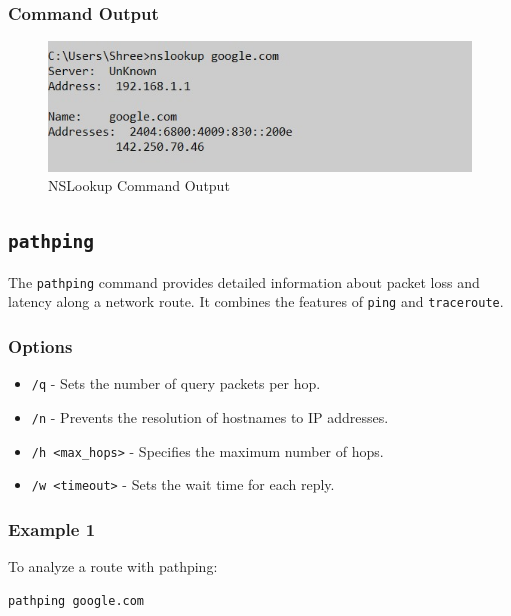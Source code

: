 \documentclass{article}
\begin{document}
\subsubsection{Command Output}
\begin{figure}[htbp]
    \centering
    \includegraphics[]{nslookup.png}
    \caption{NSLookup Command Output}
    \label{fig:nslookup_output}
\end{figure}
\clearpage  %
\subsection{\texttt{pathping}}
The \texttt{pathping} command provides detailed information about packet loss and latency along a network route. It combines the features of \texttt{ping} and \texttt{traceroute}.

\subsubsection{Options}
\begin{itemize}
    \item \texttt{/q} - Sets the number of query packets per hop.
    \item \texttt{/n} - Prevents the resolution of hostnames to IP addresses.
    \item \texttt{/h \textless max\_hops\textgreater} - Specifies the maximum number of hops.
    \item \texttt{/w \textless timeout\textgreater} - Sets the wait time for each reply.
\end{itemize}

\subsubsection{Example 1}
To analyze a route with pathping:
\begin{verbatim}
pathping google.com
\end{verbatim}
\end{document}
